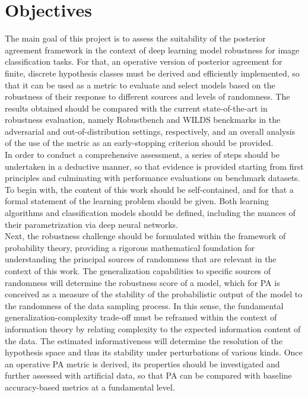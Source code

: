 \section{Objectives}

The main goal of this project is to assess
the suitability of the posterior agreement framework in the 
context of deep learning model robustness for image 
classification tasks. For that, an operative version of posterior
agreement for finite, discrete hypothesis classes must be derived and
efficiently implemented, so that it can be used as a metric to evaluate 
and select models based on the robustness of their response to different 
sources and levels of randomness. The results obtained should be compared
with the current state-of-the-art in robustness evaluation, namely
Robustbench
\cite{croceRobustBenchStandardizedAdversarial2021a}
and WILDS 
\cite{kohWILDSBenchmarkIntheWild2021}
benckmarks in the adversarial and
out-of-distribution settings, respectively, and an overall
analysis of the use of the metric as an early-stopping 
criterion should be provided.\\

In order to conduct a comprehensive assessment, a series of steps should be undertaken in a 
deductive manner, so that evidence is provided starting from first principles and culminating
with performance evaluations on benchmark datasets. To begin with, the content of this work should
be self-contained, and for that a formal statement of the learning problem should be given. Both 
learning algorithms and classification models should be defined, including the nuances of their
parametrization via deep neural networks. \\

Next, the robustness challenge should be formulated within the framework of probability theory,
providing a rigorous mathematical foundation for understanding the principal sources of randomness that
are relevant in the context of this work. The generalization capabilities to specific sources of randomness
will determine the robustness score of a model, which for PA is conceived as a 
measure of the stability of the probabilistic output of the model to the randomness of the data 
sampling process. In this sense, the fundamental generalization-complexity trade-off must be reframed
within the context of information theory by relating complexity to the expected information content
of the data. The estimated informativeness will determine the resolution of the hypothesis space and
thus its stability under perturbations of various kinds. Once an operative PA metric is derived, 
its properties should be investigated and further assessed with artificial data, so that PA can be compared 
with baseline accuracy-based metrics at a fundamental level. \\

